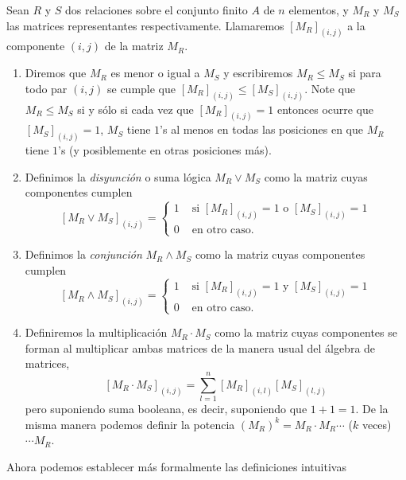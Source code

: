 \begin{definicion}
Sean $R$ y $S$ dos relaciones sobre el conjunto finito $A$ de $n$ elementos, y $M_R$ y $M_S$ las matrices representantes respectivamente.
Llamaremos $[M_R]_{(i,j)}$ a la componente $(i,j)$ de la matriz $M_R$.
\begin{enumerate}
  \itemsep 0pt
  \item Diremos que $M_R$ es menor o igual a $M_S$ y escribiremos $M_R\leq M_S$ si para todo par $(i,j)$ se cumple que $[M_R]_{(i,j)}\leq[M_S]_{(i,j)}$.
  Note que $M_R\leq M_S$ si y sólo si cada vez que $[M_R]_{(i,j)}=1$ entonces ocurre que $[M_S]_{(i,j)}=1$, $M_S$ tiene $1$'s al menos en todas las posiciones en que $M_R$ tiene $1$'s (y posiblemente en otras posiciones más).
  \item Definimos la \emph{disyunción} o suma lógica $M_R\vee M_S$ como la matriz cuyas componentes cumplen 
  \[
  [M_R\vee M_S]_{(i,j)}=\left\{
  						\begin{array}{lr}
  						1 & \text{ si }[M_R]_{(i,j)}=1\text{ o }[M_S]_{(i,j)}=1 \\
  						0 & \text{ en otro caso.}
  						\end{array}\right.
  \]
  \item Definimos la \emph{conjunción} $M_R\wedge M_S$ como la matriz cuyas componentes cumplen
  \[
  [M_R\wedge M_S]_{(i,j)}=\left\{
  						\begin{array}{lr}
  						1 & \text{ si }[M_R]_{(i,j)}=1\text{ y }[M_S]_{(i,j)}=1 \\
  						0 & \text{ en otro caso.}
  						\end{array}\right.
  \]
  \item Definiremos la multiplicación $M_R\cdot M_S$ como la matriz cuyas componentes se forman al multiplicar ambas matrices de la manera usual del álgebra de matrices,
  \[
  [M_R\cdot M_S]_{(i,j)}=\sum_{l=1}^n[M_R]_{(i,l)}[M_S]_{(l,j)}
  \] 
  pero suponiendo suma booleana, es decir, suponiendo que $1+1=1$.
  De la misma manera podemos definir la potencia $(M_R)^k=M_R\cdot M_R\cdots$ ($k$ veces) $\cdots M_R$.
\end{enumerate}
\end{definicion}

Ahora podemos establecer más formalmente las definiciones intuitivas

